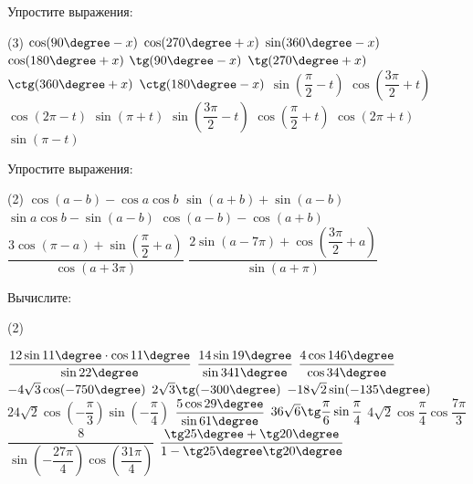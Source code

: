 \begin{consultation}
	\begin{listofex}
		\item Упростите выражения:
		\begin{tasks}(3)
			\task \( \cos(90\degree - x) \)
			\task \( \cos(270\degree + x) \)
			\task \( \sin(360\degree - x) \)
			\task \( \cos(180\degree + x) \)
			\task \( \tg(90\degree - x) \)
			\task \( \tg(270\degree + x) \)
			\task \( \ctg(360\degree + x) \)
			\task \( \ctg(180\degree - x) \)
			\task \( \sin \left( \dfrac{\pi}{2}-t \right)  \)
			\task \( \cos \left( \dfrac{3\pi}{2}+t \right) \)
			\task \( \cos(2\pi-t) \)
			\task \( \sin(\pi+t) \)
			\task \( \sin \left( \dfrac{3\pi}{2}-t \right)  \)
			\task \( \cos \left( \dfrac{\pi}{2}+t \right) \)
			\task \( \cos(2\pi+t) \)
			\task \( \sin(\pi-t) \)
		\end{tasks}
		\item Упростите выражения:
		\begin{tasks}(2)
			\task \( \cos (a-b) - \cos a \cos b \)
			\task \( \sin(a+b) + \sin(a-b) \)
			\task \( \sin a \cos b - \sin(a-b) \)
			\task \( \cos(a-b)-\cos(a+b) \)
			\task \( \dfrac{3\cos(\pi-a)+\sin \left( \dfrac{\pi}{2} + a \right)}{\cos (a + 3 \pi)} \)
			\task \( \dfrac{2 \sin(a-7\pi)+\cos \left( \dfrac{3\pi}{2}+a \right)}{\sin(a+\pi)} \)
		\end{tasks}
		\item Вычислите:
		\begin{tasks}(2)
			
			\task \( \dfrac{12 \sin 11 \degree \cdot \cos 11 \degree}{\sin 22 \degree} \)
			\task \( \dfrac{14 \sin 19 \degree}{\sin 341 \degree} \)
			\task \( \dfrac{4 \cos 146 \degree}{\cos 34 \degree} \)
			\task \( -4 \sqrt{3} \cos (-750 \degree) \)
			\task \( 2 \sqrt{3} \tg(-300\degree) \)
			\task \( -18\sqrt{2} \sin(-135 \degree) \)
			\task \( 24 \sqrt{2} \cos \left( -\dfrac{\pi}{3} \right) \sin \left( -\dfrac{\pi}{4} \right) \)
			\task \( \dfrac{5 \cos 29 \degree}{\sin 61 \degree} \)
			\task \( 36 \sqrt{6} \tg \dfrac{\pi}{6} \sin \dfrac{\pi}{4} \)
			\task \( 4 \sqrt{2} \cos \dfrac{\pi}{4} \cos \dfrac{7\pi}{3} \)
			\task \( \dfrac{8}{\sin \left( -\dfrac{27\pi}{4} \right) \cos \left( \dfrac{31\pi}{4} \right) }  \)
			\task \( \dfrac{\tg 25 \degree + \tg 20 \degree}{1-\tg 25 \degree \tg 20 \degree} \)
			
		\end{tasks}
	\end{listofex}
\end{consultation}


